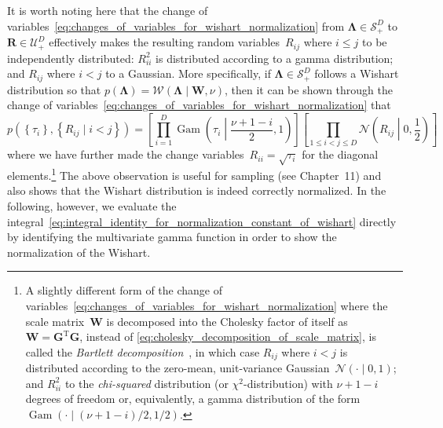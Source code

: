 \documentclass[12pt,a4paper]{article}
\begin{document}
It is worth noting here that
the change of variables~\eqref{eq:changes_of_variables_for_wishart_normalization}
from $\bm{\Lambda} \in \mathcal{S}_{+}^{D}$ to $\mathbf{R} \in \mathcal{U}_{+}^{D}$
effectively makes the resulting random variables~$R_{ij}$ where $i \leqslant j$
to be independently distributed:
$R_{ii}^{2}$ is distributed according to a gamma distribution; and
$R_{ij}$ where $i < j$ to a Gaussian.
More specifically,
if $\bm{\Lambda} \in \mathcal{S}_{+}^{D}$ follows a Wishart distribution so that
$p\left(\bm{\Lambda}\right) = \mathcal{W}\left( \bm{\Lambda} \middle| \mathbf{W}, \nu \right)$,
then it can be shown through
the change of variables~\eqref{eq:changes_of_variables_for_wishart_normalization} that
\begin{equation}
p\left(\left\{\tau_i\right\}, \left\{ R_{ij} \mid i < j \right\}\right) =
\left[
\prod_{i=1}^{D} \operatorname{Gam}\left( \tau_{i} \middle| \frac{\nu + 1 - i}{2}, 1 \right)
\right]
\left[
\prod_{1 \leqslant i < j \leqslant D} \mathcal{N}\left( R_{ij} \middle| 0, \frac{1}{2} \right)
\right]
\end{equation}
where we have further made the change variables~$R_{ii} = \sqrt{\tau_{i}}$
for the diagonal elements.\footnote{%
A slightly different form of
the change of variables~\eqref{eq:changes_of_variables_for_wishart_normalization}
where the scale matrix~$\mathbf{W}$ is decomposed into the Cholesky factor of itself as
$\mathbf{W} = \mathbf{G}^{\operatorname{T}}\mathbf{G}$,
instead of \eqref{eq:cholesky_decomposition_of_scale_matrix},
is called the \emph{Bartlett decomposition}~\citep{Anderson:Multivariate},
in which case $R_{ij}$ where $i < j$ is distributed according to
the zero-mean, unit-variance Gaussian~$\mathcal{N}\left( \cdot \middle| 0, 1 \right)$; and
$R_{ii}^2$ to the \emph{chi-squared} distribution (or $\chi^2$-distribution) with
$\nu + 1 - i$ degrees of freedom or, equivalently,
a gamma distribution of the form~%
$\operatorname{Gam}\left( \cdot \middle| (\nu + 1 - i)/2, 1/2 \right)$.}
The above observation is useful for sampling (see Chapter~11)
and also shows that the Wishart distribution is indeed correctly normalized.
In the following, however, we evaluate
the integral~\eqref{eq:integral_identity_for_normalization_constant_of_wishart}
directly by identifying the multivariate gamma function
in order to show the normalization of the Wishart.
\end{document}
